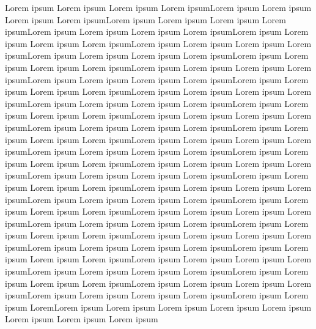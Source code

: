 Lorem ipsum Lorem ipsum Lorem ipsum Lorem ipsumLorem ipsum Lorem ipsum Lorem ipsum Lorem ipsumLorem ipsum Lorem ipsum Lorem ipsum Lorem ipsumLorem ipsum Lorem ipsum Lorem ipsum Lorem ipsumLorem ipsum Lorem ipsum Lorem ipsum Lorem ipsumLorem ipsum Lorem ipsum Lorem ipsum Lorem ipsumLorem ipsum Lorem ipsum Lorem ipsum Lorem ipsumLorem ipsum Lorem ipsum Lorem ipsum Lorem ipsumLorem ipsum Lorem ipsum Lorem ipsum Lorem ipsumLorem ipsum Lorem ipsum Lorem ipsum Lorem ipsumLorem ipsum Lorem ipsum Lorem ipsum Lorem ipsumLorem ipsum Lorem ipsum Lorem ipsum Lorem ipsumLorem ipsum Lorem ipsum Lorem ipsum Lorem ipsumLorem ipsum Lorem ipsum Lorem ipsum Lorem ipsumLorem ipsum Lorem ipsum Lorem ipsum Lorem ipsumLorem ipsum Lorem ipsum Lorem ipsum Lorem ipsumLorem ipsum Lorem ipsum Lorem ipsum Lorem ipsumLorem ipsum Lorem ipsum Lorem ipsum Lorem ipsumLorem ipsum Lorem ipsum Lorem ipsum Lorem ipsumLorem ipsum Lorem ipsum Lorem ipsum Lorem ipsumLorem ipsum Lorem ipsum Lorem ipsum Lorem ipsumLorem ipsum Lorem ipsum Lorem ipsum Lorem ipsumLorem ipsum Lorem ipsum Lorem ipsum Lorem ipsumLorem ipsum Lorem ipsum Lorem ipsum Lorem ipsumLorem ipsum Lorem ipsum Lorem ipsum Lorem ipsumLorem ipsum Lorem ipsum Lorem ipsum Lorem ipsumLorem ipsum Lorem ipsum Lorem ipsum Lorem ipsumLorem ipsum Lorem ipsum Lorem ipsum Lorem ipsumLorem ipsum Lorem ipsum Lorem ipsum Lorem ipsumLorem ipsum Lorem ipsum Lorem ipsum Lorem ipsumLorem ipsum Lorem ipsum Lorem ipsum Lorem ipsumLorem ipsum Lorem ipsum Lorem ipsum Lorem ipsumLorem ipsum Lorem ipsum Lorem ipsum Lorem ipsumLorem ipsum Lorem ipsum Lorem ipsum Lorem ipsumLorem ipsum Lorem ipsum Lorem ipsum Lorem ipsumLorem ipsum Lorem ipsum Lorem ipsum Lorem ipsumLorem ipsum Lorem ipsum Lorem ipsum Lorem ipsumLorem ipsum Lorem ipsum LoremLorem ipsum Lorem ipsum Lorem ipsum Lorem ipsum
Lorem ipsum Lorem ipsum Lorem ipsum Lorem ipsum
